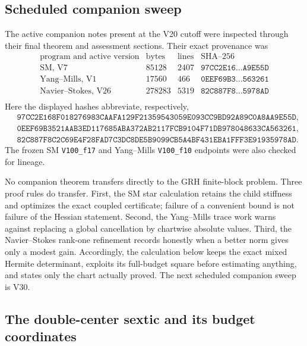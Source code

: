 \documentclass[11pt]{article}
\theoremstyle{definition}
\theoremstyle{remark}
\begin{document}
\subsection{Scheduled companion sweep}
\label{subsec:f2v20-sweep}

The active companion notes present at the V20 cutoff were inspected through
their final theorem and assessment sections.  Their exact provenance was
\[
\begin{array}{c|r|r|l}
\text{program and active version}&\text{bytes}&\text{lines}&
 \text{SHA--256}\\
\hline
\text{SM, V7}&85128&2407&\texttt{97CC2E16\ldots A9E55D}\\
\text{Yang--Mills, V1}&17560&466&\texttt{0EEF69B3\ldots 563261}\\
\text{Navier--Stokes, V26}&278283&5319&\texttt{82C887F8\ldots 5978AD}\\
\end{array}
\tag{N20.1}
\]
Here the displayed hashes abbreviate, respectively,
\begin{align*}
&\texttt{97CC2E168F018276983CAAFA129F21359543059E093CC9BD92A89C0A8AA9E55D},\\
&\texttt{0EEF69B3521AAB3ED117685ABA372AB2117FCB9104F71DB978048633CA563261},\\
&\texttt{82C887F8C2C69E4F28FAD7C3DC8DE5B9099CB5A4BF431EBA1FFF3E91935978AD}.
\end{align*}
The frozen SM \texttt{V100\_f17} and Yang--Mills
\texttt{V100\_f10} endpoints were also checked for lineage.

No companion theorem transfers directly to the GRH finite-block problem.
Three proof rules do transfer.  First, the SM star calculation retains the
child stiffness and optimizes the exact coupled certificate; failure of a
convenient bound is not failure of the Hessian statement.  Second, the
Yang--Mills trace work warns against replacing a global cancellation by
chartwise absolute values.  Third, the Navier--Stokes rank-one refinement
records honestly when a better norm gives only a modest gain.  Accordingly,
the calculation below keeps the exact mixed Hermite determinant, exploits
its full-budget square before estimating anything, and states only the chart
actually proved.  The next scheduled companion sweep is V30.

\subsection{The double-center sextic and its budget coordinates}
\label{subsec:f2v20-setup}
\end{document}
